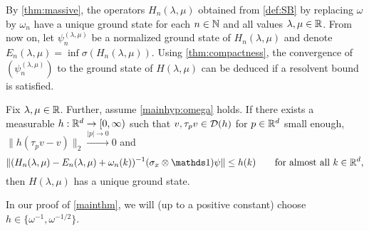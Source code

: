 \documentclass[a4paper,12pt,oneside]{article}
\newcommand{\pln}{\psi_n^{(\lambda,\mu)}}
\begin{document}
By \cref{thm:massive}, the operators $H_n(\lambda,\mu)$ obtained from \cref{def:SB} by replacing $\omega$ by $\omega_n$ have a unique ground state for each $n\in{\mathbb N}$ and all values $\lambda,\mu\in{\mathbb R}$. From now on, let $\pln$ be a normalized ground state of $H_n(\lambda,\mu)$ and denote $E_n(\lambda,\mu)=\inf\sigma(H_n(\lambda,\mu))$.
Using \cref{thm:compactness}, the convergence of $(\pln)$ to the ground state of $H(\lambda,\mu)$ can be deduced if a resolvent bound is satisfied.
\begin{thm}\label{thm:resolventbound} Fix $\lambda,\mu\in{\mathbb R}$. Further,
	assume \cref{mainhyp:omega} holds. If there exists a measurable $h:{\mathbb R}^d\to[0,\infty)$ such that $v,\tau_p v\in {\mathcal D}(h)$ for $p\in{\mathbb R}^d$ small enough, $\|h(\tau_pv-v)\|_2\xrightarrow{|p|\to 0} 0$ and
	\begin{equation}\label{eq:resbound}
		\|(H_n(\lambda,\mu)-E_n(\lambda,\mu)+\omega_n(k))^{-1}(\sigma_x\otimes \Id) \psi\| \le h(k) \qquad\mbox{for almost all}\ k\in \IR^d,
	\end{equation}
	then $H(\lambda,\mu)$ has a unique ground state.
\end{thm}
\begin{rem}
	In our proof of \cref{mainthm}, we will (up to a positive constant) choose $h\in\{\omega^{-1},\omega^{-1/2}\}$.
\end{rem}
\end{document}

